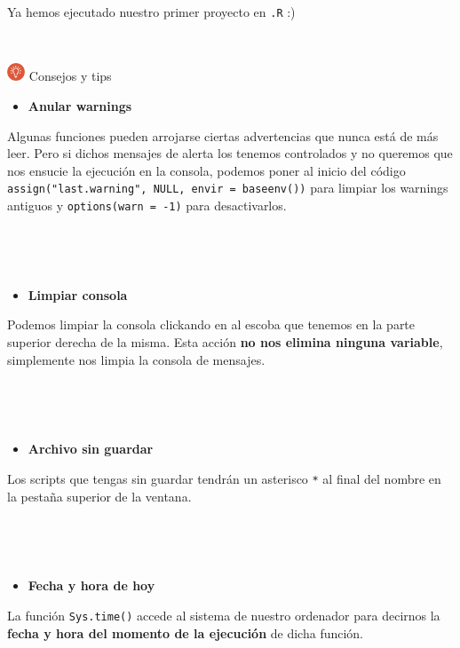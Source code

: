 \documentclass[11pt,]{book}
\providecommand{\tightlist}{%
  \setlength{\itemsep}{0pt}\setlength{\parskip}{0pt}}
\begin{document}
Ya hemos ejecutado nuestro primer proyecto en \texttt{.R} :)

~

\includegraphics[width=0.04\textwidth,height=\textheight]{img/logo_info.png} Consejos y tips

\begin{itemize}
\tightlist
\item
  \textbf{Anular warnings}
\end{itemize}

Algunas funciones pueden arrojarse ciertas advertencias que nunca está de más leer. Pero si dichos mensajes de alerta los tenemos controlados y no queremos que nos ensucie la ejecución en la consola, podemos poner al inicio del código \texttt{assign("last.warning",\ NULL,\ envir\ =\ baseenv())} para limpiar los warnings antiguos y \texttt{options(warn\ =\ -1)} para desactivarlos.

~

~

\begin{itemize}
\tightlist
\item
  \textbf{Limpiar consola}
\end{itemize}

Podemos limpiar la consola clickando en al escoba que tenemos en la parte superior derecha de la misma. Esta acción \textbf{no nos elimina ninguna variable}, simplemente nos limpia la consola de mensajes.

~

~

\begin{itemize}
\tightlist
\item
  \textbf{Archivo sin guardar}
\end{itemize}

Los scripts que tengas sin guardar tendrán un asterisco \texttt{*} al final del nombre en la pestaña superior de la ventana.

~

~

\begin{itemize}
\tightlist
\item
  \textbf{Fecha y hora de hoy}
\end{itemize}

La función \texttt{Sys.time()} accede al sistema de nuestro ordenador para decirnos la \textbf{fecha y hora del momento de la ejecución} de dicha función.
\end{document}
